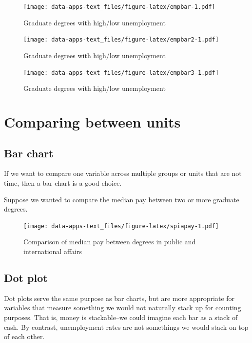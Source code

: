 \documentclass[
]{book}
\begin{document}
\begin{figure}
\centering
\texttt{[image: data-apps-text\_files/figure-latex/empbar-1.pdf]}
\caption{\label{fig:empbar}Graduate degrees with high/low unemployment}
\end{figure}

\begin{figure}
\centering
\texttt{[image: data-apps-text\_files/figure-latex/empbar2-1.pdf]}
\caption{\label{fig:empbar2}Graduate degrees with high/low unemployment}
\end{figure}

\begin{figure}
\centering
\texttt{[image: data-apps-text\_files/figure-latex/empbar3-1.pdf]}
\caption{\label{fig:empbar3}Graduate degrees with high/low unemployment}
\end{figure}

\hypertarget{comparing-between-units}{%
\section{Comparing between units}\label{comparing-between-units}}

\hypertarget{bar-chart-1}{%
\subsection{Bar chart}\label{bar-chart-1}}

If we want to compare one variable across multiple groups or units that are not time, then a bar chart is a good choice.

Suppose we wanted to compare the median pay between two or more graduate degrees.

\begin{figure}
\centering
\texttt{[image: data-apps-text\_files/figure-latex/spiapay-1.pdf]}
\caption{\label{fig:spiapay}Comparison of median pay between degrees in public and international affairs}
\end{figure}

\hypertarget{dot-plot}{%
\subsection{Dot plot}\label{dot-plot}}

Dot plots serve the same purpose as bar charts, but are more appropriate for variables that measure something we would not naturally stack up for counting purposes. That is, money is stackable--we could imagine each bar as a stack of cash. By contrast, unemployment rates are not somethings we would stack on top of each other.
\end{document}
